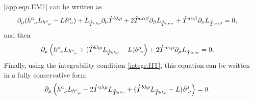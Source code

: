 \documentclass[
10pt, %
a4paper, %
oneside, %
headinclude,footinclude, %
BCOR5mm, %
]{scrartcl}
\newcommand{\pd}[1]{\partial_{#1}}
\newcommand{\tetrsymbol}{h}
\newcommand{\tetr}[2]{\tetrsymbol^{#1}_{\phantom{#1}#2}}
\newcommand{\dT}[2]{D_{#1}^{\phantom{#1}\,#2}}	%
\newcommand{\bT}[2]{B^{#1#2}}	%
\newcommand{\Laghodge}{L}%
\newcommand{\LagST}{\mathcal{U}}%
\newcommand{\LCsymb}{\bm{\in}}    %
\newcommand{\HDT}[1]{\accentset{\star}{T}^{#1}}
\newcommand{\KD}[2]{\delta^{#1}_{\,\,#2}}
\begin{document}
\eqref{app.eqn.EM1} can be written as
\begin{equation}
\pd{\mu}(\tetr{a}{\nu}\Laghodge_{\tetr{a}{\mu}} - L \delta^\mu_{\ \nu}) +
\Laghodge_{\HDT{b\lambda\rho}}\pd{\nu}\HDT{b\lambda\rho} +
2\HDT{a\alpha\beta}\pd{\beta}\Laghodge_{\HDT{a\nu\alpha}} + 
\HDT{a\alpha\beta}\pd{\nu}\Laghodge_{\HDT{a\alpha\beta}} = 0,
\end{equation} 
and then
\begin{equation}
\pd{\mu}\left(\tetr{a}{\nu}\Laghodge_{\tetr{a}{\mu}} + 
(\HDT{b\lambda\rho}\Laghodge_{\HDT{b\lambda\rho}}- 
L) \delta^\mu_{\ \nu} \right) +
2\HDT{a\alpha\mu}\pd{\mu}\Laghodge_{\HDT{a\nu\alpha}} = 0,
\end{equation} 
Finally, using the integrability condition \eqref{integr.HT}, this equation can be written in a 
fully conservative form
\begin{equation}
\pd{\mu}\left(\tetr{a}{\nu}\Laghodge_{\tetr{a}{\mu}} -
2\HDT{a\lambda\mu}\Laghodge_{\HDT{a\lambda\nu}}
+
(\HDT{b\lambda\rho}\Laghodge_{\HDT{b\lambda\rho}}- 
L) \delta^\mu_{\ \nu} \right) = 0.
\end{equation} 


%
\end{document}
